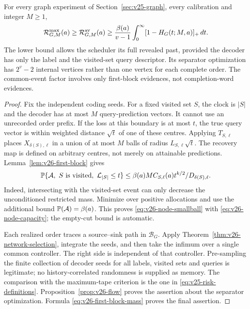 \begin{theorem}\label{thm:v26-separator}
For every graph experiment of Section~\ref{sec:v25-graph}, every
calibration and integer $M\ge1$,
\begin{equation}\label{eq:v26-capacity-risk}
 \mathcal R^{\rm max}_{G,M}(a)\ge
 \mathcal R^{\rm av}_{G,M}(a)\ge
 \frac{\beta(a)}{v-1}\int_0^\infty
                             [1-H_G(t;M,a)]_+\,dt.
\end{equation}
The lower bound allows the scheduler its full revealed past, provided
the decoder has only the label and the visited-set query descriptor.
Its separator optimization has $2^v-2$ internal vertices rather than
one vertex for each complete order. The common-event factor involves
only first-block evidences, not completion-word evidences.
\end{theorem}
\begin{proof}
Fix the independent coding seeds. For a fixed visited set $S$, the
clock is $|S|$ and the decoder has at most $M$ query-prediction vectors.
It cannot use an unrecorded order prefix. If the loss at this boundary
is at most $t$, the true query vector is within weighted distance
$\sqrt t$ of one of these centres. Applying $T_{S,\ell}$ places
$X_{\delta(S),\ell}$ in a union of at most $M$ balls of radius
$L_{S,\ell}\sqrt t$. The recovery map is defined on arbitrary
centres, not merely on attainable predictions. Lemma~\ref{lem:v26-first-block}
gives
\[
 \Prob\{\mathcal A,\ S\text{ is visited},\ \mathcal L_{|S|}\le t\}
 \le\beta(a)M C_{S,\ell}(a)t^{k/2}/D_{\delta(S),\ell}.
\]
Indeed, intersecting with the visited-set event can only decrease the
unconditioned restricted mass. Minimize over positive allocations and
use the additional bound $\mathbb P(\mathcal A)=\beta(a)$.
This proves \eqref{eq:v26-node-smallball} with
\eqref{eq:v26-node-capacity}; the empty-cut bound is automatic.

Each realized order traces a source--sink path in $\mathscr B_G$.
Apply Theorem~\ref{thm:v26-network-selection}, integrate the seeds,
and then take the infimum over a single common controller. The
right side is independent of that controller. Pre-sampling the finite
collection of decoder seeds for all labels, visited sets and queries
is legitimate; no history-correlated randomness is supplied as memory.
The comparison with the maximum-tape criterion is the one in
\eqref{eq:v25-risk-definitions}. Proposition~\ref{prop:v26-flow}
proves the assertion about the separator optimization. Formula
\eqref{eq:v26-first-block-mass} proves the final assertion.
\end{proof}

